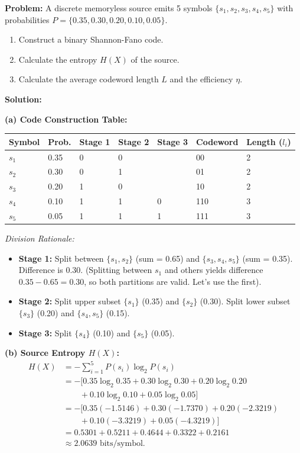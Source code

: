 \documentclass[12pt,a4paper]{article}
\begin{document}
\begin{tcolorbox}[examplebox, title={Worked Example: Shannon-Fano Coding}]
\textbf{Problem:} A discrete memoryless source emits 5 symbols $\{s_1, s_2, s_3, s_4, s_5\}$ with probabilities $P = \{0.35, 0.30, 0.20, 0.10, 0.05\}$. 
\begin{enumerate}[label=\alph*., leftmargin=*, itemsep=1pt, topsep=1pt]
  \item Construct a binary Shannon-Fano code.
  \item Calculate the entropy $H(X)$ of the source.
  \item Calculate the average codeword length $L$ and the efficiency $\eta$.
\end{enumerate}
\textbf{Solution:}

\textbf{(a) Code Construction Table:}\par\noindent
\begin{tabularx}{\linewidth}{|B{1.5cm}|Y|Y|Y|Y|B{2.2cm}|B{1.6cm}|}
\hline
\textbf{Symbol} & \textbf{Prob.} & \textbf{Stage 1} & \textbf{Stage 2} & \textbf{Stage 3} & \textbf{Codeword} & \textbf{Length ($l_i$)} \\
\hline
$s_1$ & 0.35 & 0 & 0 & & 00 & 2 \\
$s_2$ & 0.30 & 0 & 1 & & 01 & 2 \\
\hline
$s_3$ & 0.20 & 1 & 0 & & 10 & 2 \\
$s_4$ & 0.10 & 1 & 1 & 0 & 110 & 3 \\
$s_5$ & 0.05 & 1 & 1 & 1 & 111 & 3 \\
\hline
\end{tabularx}
\par\vspace{4pt}
\textit{Division Rationale:}
\begin{itemize}[leftmargin=*, itemsep=1pt]
  \item \textbf{Stage 1:} Split between $\{s_1, s_2\}$ (sum = 0.65) and $\{s_3, s_4, s_5\}$ (sum = 0.35). Difference is $0.30$. (Splitting between $s_1$ and others yields difference $0.35 - 0.65 = 0.30$, so both partitions are valid. Let's use the first).
  \item \textbf{Stage 2:} Split upper subset $\{s_1\}$ (0.35) and $\{s_2\}$ (0.30). Split lower subset $\{s_3\}$ (0.20) and $\{s_4, s_5\}$ (0.15).
  \item \textbf{Stage 3:} Split $\{s_4\}$ (0.10) and $\{s_5\}$ (0.05).
\end{itemize}

\textbf{(b) Source Entropy $H(X)$:}
\begin{align*}
  H(X) &= -\sum_{i=1}^5 P(s_i) \log_2 P(s_i) \\
  &= -\bigl[0.35\log_2 0.35 + 0.30\log_2 0.30 + 0.20\log_2 0.20 \\
  &\qquad + 0.10\log_2 0.10 + 0.05\log_2 0.05\bigr] \\
  &= -\bigl[0.35(-1.5146) + 0.30(-1.7370) + 0.20(-2.3219) \\
  &\qquad + 0.10(-3.3219) + 0.05(-4.3219)\bigr] \\
  &= 0.5301 + 0.5211 + 0.4644 + 0.3322 + 0.2161 \\
  &\approx 2.0639 \text{ bits/symbol}.
\end{align*}


\end{tcolorbox}
\end{document}
